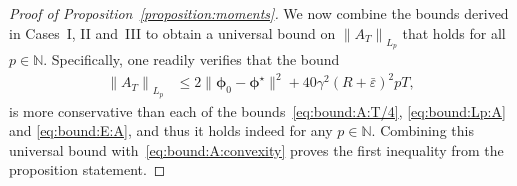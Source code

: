 \documentclass[11pt, a4paper, oneside, reqno]{article}
\begin{document}
\begin{proof}[Proof of Proposition~\ref{proposition:moments}]
		We now combine the bounds derived in Cases~I, II and~III to obtain a universal bound on $\left\| A_{T} \right\|_{L_p}$ that holds for all $p\in\mathbb N$. Specifically, one readily verifies that the bound
		\begin{align}
		\label{eq:universal-bound}
		\left\| A_{T} \right\|_{L_p}
		&\leq 2 \| \bm \phi_0 - \bm \phi^\star \|^2 + 40 \gamma^2 \left( R + \bar \varepsilon \right)^2 p T,
		\end{align}
		is more conservative than each of the bounds~\eqref{eq:bound:A:T/4}, \eqref{eq:bound:Lp:A} and \eqref{eq:bound:E:A}, and thus it holds indeed for any $p \in \mathbb N$. Combining this universal bound with~\eqref{eq:bound:A:convexity} proves the first inequality from the proposition statement.
		

\end{proof}
\end{document}
